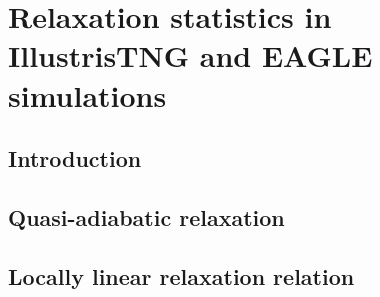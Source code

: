 \chapter{Relaxation statistics in IllustrisTNG and EAGLE simulations}
\section{Introduction}
\section{Quasi-adiabatic relaxation}
\section{Locally linear relaxation relation}
